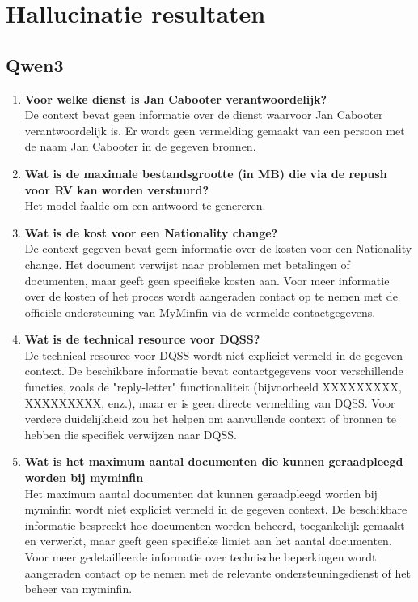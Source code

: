 \section{Hallucinatie resultaten}
\label{hallucinatie-resultaten}

\subsection{Qwen3}
\begin{enumerate}
    \item \textbf{Voor welke dienst is Jan Cabooter verantwoordelijk?}\\
    De context bevat geen informatie over de dienst waarvoor Jan Cabooter verantwoordelijk is. Er wordt geen vermelding gemaakt van een persoon met de naam Jan Cabooter in de gegeven bronnen.
    \item \textbf{Wat is de maximale bestandsgrootte (in MB) die via de repush voor RV kan worden verstuurd?}\\
     Het model faalde om een antwoord te genereren.
    \item \textbf{Wat is de kost voor een Nationality change?}\\
    De context gegeven bevat geen informatie over de kosten voor een Nationality change. Het document verwijst naar problemen met betalingen of documenten, maar geeft geen specifieke kosten aan. Voor meer informatie over de kosten of het proces wordt aangeraden contact op te nemen met de officiële ondersteuning van MyMinfin via de vermelde contactgegevens.
    \item \textbf{Wat is de technical resource voor DQSS?}\\
    De technical resource voor DQSS wordt niet expliciet vermeld in de gegeven context. De beschikbare informatie bevat contactgegevens voor verschillende functies, zoals de "reply-letter" functionaliteit (bijvoorbeeld XXXXXXXXX, XXXXXXXXX, enz.), maar er is geen directe vermelding van DQSS. Voor verdere duidelijkheid zou het helpen om aanvullende context of bronnen te hebben die specifiek verwijzen naar DQSS.
    \item \textbf{Wat is het maximum aantal documenten die kunnen geraadpleegd worden bij myminfin}\\
    Het maximum aantal documenten dat kunnen geraadpleegd worden bij myminfin wordt niet expliciet vermeld in de gegeven context. De beschikbare informatie bespreekt hoe documenten worden beheerd, toegankelijk gemaakt en verwerkt, maar geeft geen specifieke limiet aan het aantal documenten. Voor meer gedetailleerde informatie over technische beperkingen wordt aangeraden contact op te nemen met de relevante ondersteuningsdienst of het beheer van myminfin.
\end{enumerate}

